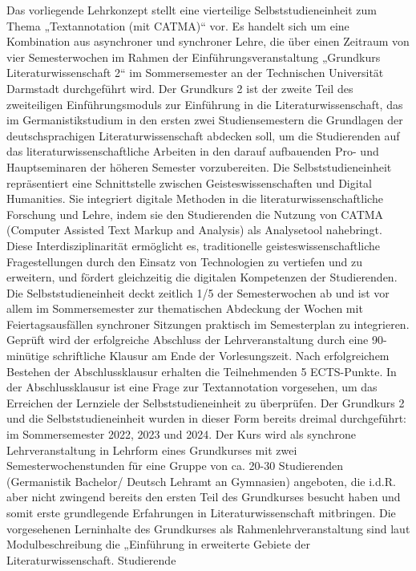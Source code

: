 \documentclass[
          a4paper,
        ]{article}
\begin{document}
Das vorliegende Lehrkonzept stellt eine vierteilige Selbststudieneinheit
zum Thema „Textannotation (mit CATMA)`` vor. Es handelt sich um eine
Kombination aus asynchroner und synchroner Lehre, die über einen
Zeitraum von vier Semesterwochen im Rahmen der Einführungsveranstaltung
„Grundkurs Literaturwissenschaft 2`` im Sommersemester an der
Technischen Universität Darmstadt durchgeführt wird. Der Grundkurs 2 ist
der zweite Teil des zweiteiligen Einführungsmoduls zur Einführung in die
Literaturwissenschaft, das im Germanistikstudium in den ersten zwei
Studiensemestern die Grundlagen der deutschsprachigen
Literaturwissenschaft abdecken soll, um die Studierenden auf das
literaturwissenschaftliche Arbeiten in den darauf aufbauenden Pro- und
Hauptseminaren der höheren Semester vorzubereiten. Die
Selbststudieneinheit repräsentiert eine Schnittstelle zwischen
Geisteswissenschaften und Digital Humanities. Sie integriert digitale
Methoden in die literaturwissenschaftliche Forschung und Lehre, indem
sie den Studierenden die Nutzung von CATMA (Computer Assisted Text
Markup and Analysis) als Analysetool nahebringt. Diese
Interdisziplinarität ermöglicht es, traditionelle
geisteswissenschaftliche Fragestellungen durch den Einsatz von
Technologien zu vertiefen und zu erweitern, und fördert gleichzeitig die
digitalen Kompetenzen der Studierenden. Die Selbststudieneinheit deckt
zeitlich 1/5 der Semesterwochen ab und ist vor allem im Sommersemester
zur thematischen Abdeckung der Wochen mit Feiertagsausfällen synchroner
Sitzungen praktisch im Semesterplan zu integrieren. Geprüft wird der
erfolgreiche Abschluss der Lehrveranstaltung durch eine 90-minütige
schriftliche Klausur am Ende der Vorlesungszeit. Nach erfolgreichem
Bestehen der Abschlussklausur erhalten die Teilnehmenden 5 ECTS-Punkte.
In der Abschlussklausur ist eine Frage zur Textannotation vorgesehen, um
das Erreichen der Lernziele der Selbststudieneinheit zu überprüfen. Der
Grundkurs 2 und die Selbststudieneinheit wurden in dieser Form bereits
dreimal durchgeführt: im Sommersemester 2022, 2023 und 2024. Der Kurs
wird als synchrone Lehrveranstaltung in Lehrform eines Grundkurses mit
zwei Semesterwochenstunden für eine Gruppe von ca. 20-30 Studierenden
(Germanistik Bachelor/ Deutsch Lehramt an Gymnasien) angeboten, die
i.d.R. aber nicht zwingend bereits den ersten Teil des Grundkurses
besucht haben und somit erste grundlegende Erfahrungen in
Literaturwissenschaft mitbringen. Die vorgesehenen Lerninhalte des
Grundkurses als Rahmenlehrveranstaltung sind laut Modulbeschreibung die
„Einführung in erweiterte Gebiete der Literaturwissenschaft. Studierende
\end{document}
